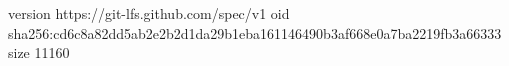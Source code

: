 version https://git-lfs.github.com/spec/v1
oid sha256:cd6c8a82dd5ab2e2b2d1da29b1eba161146490b3af668e0a7ba2219fb3a66333
size 11160
